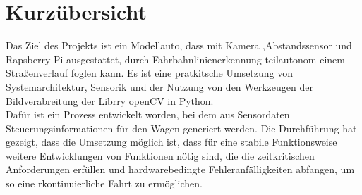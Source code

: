 \section{Kurzübersicht}
Das Ziel des Projekts ist ein Modellauto, dass mit Kamera ,Abstandssensor und
Rapsberry Pi ausgestattet, durch Fahrbahnlinienerkennung teilautonom einem
Straßenverlauf foglen kann. Es ist eine pratkitsche Umsetzung von Systemarchitektur, 
Sensorik und der Nutzung von den Werkzeugen der Bildverabreitung der Librry openCV 
in Python.\\
Dafür ist ein Prozess entwickelt worden, bei dem aus Sensordaten
Steuerungsinformationen für den Wagen generiert werden. Die Durchführung hat
gezeigt, dass die Umsetzung möglich ist, dass für eine stabile Funktionsweise
weitere Entwicklungen von Funktionen nötig sind, die die zeitkritischen
Anforderungen erfüllen und hardwarebedingte Fehleranfälligkeiten abfangen, um so
eine rkontinuierliche Fahrt zu ermöglichen.\\
